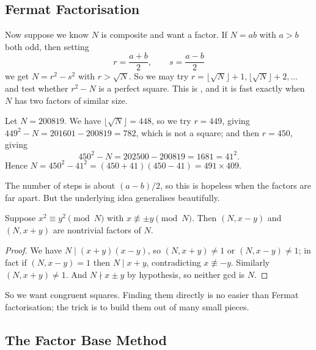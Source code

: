 \documentclass[a4paper]{scrartcl}
\begin{document}
\subsection{Fermat Factorisation}

Now suppose we know $N$ is composite and want a factor. If $N = ab$ with $a > b$ both odd, then setting
$$
r = \frac{a+b}2, \qquad s = \frac{a - b}2
$$
we get $N = r^2 - s^2$ with $r > \sqrt N$. So we may try $r = \lfloor\sqrt N\rfloor + 1, \lfloor\sqrt N\rfloor+2, \dots$ and test whether $r^2 - N$ is a perfect square. This is , and it is fast exactly when $N$ has two factors of similar size.

\begin{example}
	Let $N = 200819$. We have $\lfloor\sqrt N\rfloor = 448$, so we try $r = 449$, giving $449^2 - N = 201601 - 200819 = 782$, which is not a square; and then $r = 450$, giving
	$$
	450^2 - N = 202500 - 200819 = 1681 = 41^2.
	$$
	Hence $N = 450^2 - 41^2 = (450+41)(450-41) = 491\times409$.
\end{example}

The number of steps is about $(a - b)/2$, so this is hopeless when the factors are far apart. But the underlying idea generalises beautifully.

\begin{proposition}\label{prop:congsquares}
	Suppose $x^2 \equiv y^2 \pmod N$ with $x \not\equiv \pm y \pmod N$. Then $(N, x-y)$ and $(N, x+y)$ are nontrivial factors of $N$.
\end{proposition}
\begin{proof}
	We have $N \mid (x+y)(x-y)$, so $(N, x+y) \neq 1$ or $(N, x - y) \neq 1$; in fact if $(N, x-y) = 1$ then $N \mid x+y$, contradicting $x \not\equiv -y$. Similarly $(N, x+y) \neq 1$. And $N \nmid x \pm y$ by hypothesis, so neither gcd is $N$.
\end{proof}

So we want congruent squares. Finding them directly is no easier than Fermat factorisation; the trick is to build them out of many small pieces.

\subsection{The Factor Base Method}
\end{document}
